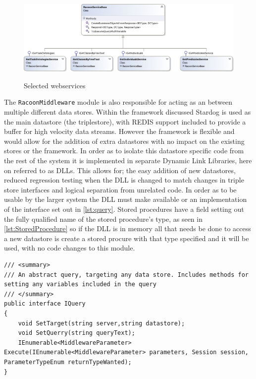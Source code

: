  \begin{figure}
\myfloatalign
{\includegraphics[width=\paperwidth]{gfx/RacoonServices}} 
\caption{Selected webservices}
\label{fig:services}
\end{figure}

The \texttt{RacoonMiddleware} module is also responsible for acting as an  between multiple different data stores. Within the framework discussed Stardog is used as the main datastore (the triplestore), with REDIS support included to provide a buffer for high velocity data streams. However the framework is flexible and would allow for the addition of extra datastores with no impact on the existing stores or the framework. In order as to isolate this datastore specific code from the rest of the system it is implemented in separate Dynamic Link Libraries, here on referred to as DLLs. This allows for; the easy addition of new datastores, reduced regression testing when the DLL is changed to match changes in triple store interfaces and logical separation from unrelated code. In order as to be usable by the larger system the DLL must make available or  an implementation of the interface set out in \autoref{lst:query}. Stored procedures have a field setting out the fully qualified name of the stored procedure's type, as seen in \autoref{lst:StoredProcedure} so if the DLL is in memory all that needs be done to access a new datastore is create a stored procure with that type specified and it will be used, with no code changes to this module. 

\vfill
\begin{lstlisting}[language={[Sharp]C},frame=tb,caption={The IQuery interface, which must be implemented by all executable queries},label=lst:query]
/// <summary>
/// An abstract query, targeting any data store. Includes methods for setting any variables included in the query
/// </summary>
public interface IQuery
{
    void SetTarget(string server,string datastore);
    void SetQuerry(string queryText);
    IEnumerable<MiddlewareParameter> Execute(IEnumerable<MiddlewareParameter> parameters, Session session, ParameterTypeEnum returnTypeWanted);      
}
\end{lstlisting}

